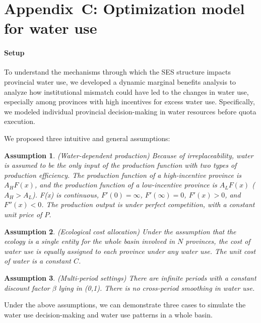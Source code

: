 \documentclass[default, sn-standardnature]{sn-jnl} %
\newtheorem{ass}{Assumption}
\begin{document}
% 

\section{Appendix~C: Optimization model for water use}\label{secS4}
\renewcommand{\thefigure}{C\arabic{figure}}
\renewcommand{\thetable}{C\arabic{table}}
\setcounter{figure}{0}
\setcounter{table}{0}

\paragraph{Setup}

To understand the mechanisms through which the SES structure impacts provincial water use, we developed a dynamic marginal benefits analysis to analyze how institutional mismatch could have led to the changes in water use, especially among provinces with high incentives for excess water use. Specifically, we modeled individual provincial decision-making in water resources before quota execution.

We proposed three intuitive and general assumptions:

\begin{ass}
(Water-dependent production) Because of irreplaceability, water is assumed to be the only input of the production function with two types of production efficiency. The production function of a high-incentive province is $A_HF(x)$, and the production function of a low-incentive province is $A_LF(x)$ ($A_H>A_L$). F(x) is continuous, $F'(0)=\infty$, $ F'(\infty)=0$, $F'(x)>0$, and $F''(x)<0$. The production output is under perfect competition, with a constant unit price of $P$.
\end{ass}

\begin{ass}
 (Ecological cost allocation) Under the assumption that the ecology is a single entity for the whole basin involved in $N$ provinces, the cost of water use is equally assigned to each province under any water use. The unit cost of water is a constant $C$.
\end{ass}
\begin{ass}
(Multi-period settings) There are infinite periods with a constant discount factor $\beta$ lying in (0,1). There is no cross-period smoothing in water use.
\end{ass}
Under the above assumptions, we can demonstrate three cases to simulate the water use decision-making and water use patterns in a whole basin.
\end{document}
